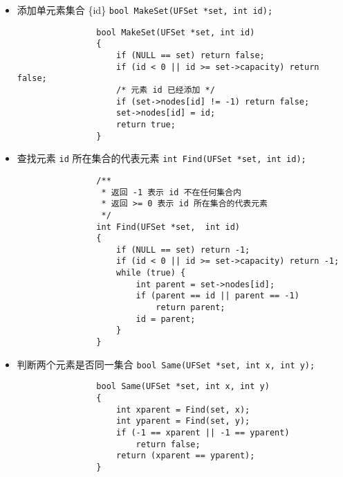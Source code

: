 \documentclass{ctexart}
\begin{document}
\begin{enumerate}
\begin{itemize}
            \item 添加单元素集合 \{id\} \texttt{bool MakeSet(UFSet *set, int id);}
                \begin{verbatim}
                bool MakeSet(UFSet *set, int id)
                {
                    if (NULL == set) return false;
                    if (id < 0 || id >= set->capacity) return false;
                    /* 元素 id 已经添加 */
                    if (set->nodes[id] != -1) return false;
                    set->nodes[id] = id;
                    return true;
                }
                \end{verbatim}

            \item 查找元素 \texttt{id} 所在集合的代表元素 \texttt{int Find(UFSet *set, int id);}
                \begin{verbatim}
                /**
                 * 返回 -1 表示 id 不在任何集合内
                 * 返回 >= 0 表示 id 所在集合的代表元素
                 */
                int Find(UFSet *set,  int id)
                {
                    if (NULL == set) return -1;
                    if (id < 0 || id >= set->capacity) return -1;
                    while (true) {
                        int parent = set->nodes[id];
                        if (parent == id || parent == -1)
                            return parent;
                        id = parent;
                    }
                }
                \end{verbatim}

            \item 判断两个元素是否同一集合 \texttt{bool Same(UFSet *set, int x, int y);}
                \begin{verbatim}
                bool Same(UFSet *set, int x, int y)
                {
                    int xparent = Find(set, x);
                    int yparent = Find(set, y);
                    if (-1 == xparent || -1 == yparent)
                        return false;
                    return (xparent == yparent);
                }
                \end{verbatim}


\end{itemize}
\end{enumerate}
\end{document}
